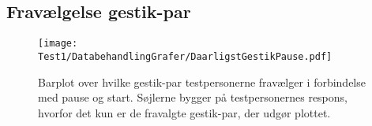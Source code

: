 \subsection{Fravælgelse gestik-par}
\label{TestresultaterSkiftDaarlig}
%



%
\begin{figure}[H]
	\centering
	\texttt{[image: Test1/DatabehandlingGrafer/DaarligstGestikPause.pdf]}
	\caption{Barplot over hvilke gestik-par testpersonerne fravælger i forbindelse med pause og start. Søjlerne bygger på testpersonernes respons, hvorfor det kun er de fravalgte gestik-par, der udgør plottet.}
	\label{fig:DaarligstGestikPause}
\end{figure}
\noindent
%